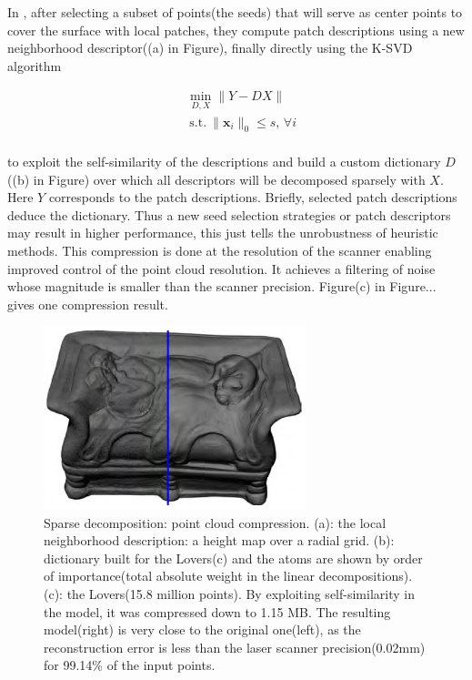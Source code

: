 In \cite{digne2014self}, after selecting a subset of points(the seeds) that will serve as center points to cover the surface with local patches,
they compute patch descriptions using a new neighborhood descriptor((a) in Figure),
finally directly using the K-SVD algorithm \cite{aharon2006svd}

\small{
\begin{equation}
\label{eq:dictcompression}
\begin{split}
&\min_{D,X}  \|Y-DX\| \\
&~\mathrm{s.t.}~ \|\mathbf{x}_i\|_0 \leq s,\,\forall i
\end{split}
\end{equation}
}
\\
to exploit the self-similarity of the descriptions and build a custom dictionary $D$((b) in Figure) over which all descriptors will be decomposed sparsely with $X$.
Here $Y$ corresponds to the patch descriptions.
Briefly, selected patch descriptions deduce the dictionary.
Thus a new seed selection strategies or patch descriptors may result in higher performance,
this just tells the unrobustness of heuristic methods.
This compression is done at the resolution of the scanner enabling improved control of the point cloud resolution.
It achieves a filtering of noise whose magnitude is smaller than the scanner precision.
Figure(c) in Figure... gives one compression result.

\begin{figure}[ht]
  \centering
  \includegraphics[width=3.0in]{images/compression_learning}
  \caption{Sparse decomposition: point cloud compression\cite{digne2014self}. (a): the local neighborhood description: a height map over a radial grid. (b): dictionary built for the Lovers(c) and the atoms are shown by order of importance(total absolute weight in the linear decompositions). (c): the Lovers(15.8 million points). By exploiting self-similarity in the model, it was compressed down to 1.15 MB. The resulting model(right) is very close to the original one(left), as the reconstruction error is less than the laser scanner precision(0.02mm) for 99.14\% of the input points.}
\end{figure}


